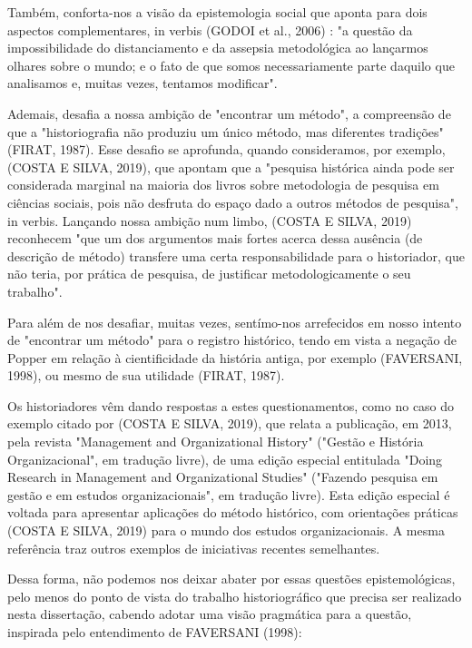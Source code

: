 Também, conforta-nos a visão da epistemologia social que aponta para dois aspectos complementares, in verbis (GODOI et al., 2006) : "a questão da impossibilidade do distanciamento e da assepsia metodológica ao lançarmos olhares sobre o mundo; e o fato de que somos necessariamente parte daquilo que analisamos e, muitas vezes, tentamos modificar".

Ademais, desafia a nossa ambição de "encontrar um método", a compreensão de que a "historiografia não produziu um único método, mas diferentes tradições" (FIRAT, 1987).  Esse desafio se aprofunda, quando consideramos, por exemplo, (COSTA E SILVA, 2019), que apontam que a "pesquisa histórica ainda pode ser considerada marginal na maioria dos livros sobre metodologia de pesquisa em ciências sociais, pois não desfruta do espaço dado a outros métodos de pesquisa", in verbis. Lançando nossa ambição num limbo,  (COSTA E SILVA, 2019) reconhecem "que um dos argumentos mais fortes acerca dessa ausência (de descrição de método) transfere uma certa responsabilidade para o historiador, que não teria, por prática de pesquisa, de justificar metodologicamente o seu trabalho".

Para além de nos desafiar, muitas vezes, sentímo-nos arrefecidos em nosso intento de "encontrar um método" para o registro histórico, tendo em vista a negação de Popper em relação à cientificidade da história antiga, por exemplo (FAVERSANI, 1998), ou mesmo de sua utilidade (FIRAT, 1987).

Os historiadores vêm dando respostas a estes questionamentos, como no caso do exemplo citado por  (COSTA E SILVA, 2019), que relata a publicação, em 2013, pela revista "Management and Organizational History" ("Gestão e História Organizacional", em tradução livre), de uma edição especial entitulada "Doing Research in Management and Organizational Studies" ("Fazendo pesquisa em gestão e em estudos organizacionais", em tradução livre). Esta edição especial é voltada para apresentar aplicações do método histórico, com orientações práticas (COSTA E SILVA, 2019) para o mundo dos estudos organizacionais. A mesma referência traz outros exemplos de iniciativas recentes semelhantes.

Dessa forma, não podemos nos deixar abater por essas questões epistemológicas, pelo menos do ponto de vista do trabalho historiográfico que precisa ser realizado nesta dissertação, cabendo adotar uma visão pragmática para a questão, inspirada pelo entendimento de FAVERSANI (1998):


